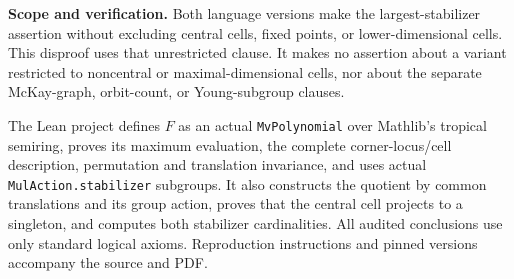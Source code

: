 \documentclass[11pt]{article}
\begin{document}
\textbf{Scope and verification.} Both language versions make the largest-stabilizer assertion without excluding central cells, fixed points, or lower-dimensional cells. This disproof uses that unrestricted clause. It makes no assertion about a variant restricted to noncentral or maximal-dimensional cells, nor about the separate McKay-graph, orbit-count, or Young-subgroup clauses.

The Lean project defines $F$ as an actual \texttt{MvPolynomial} over Mathlib's tropical semiring, proves its maximum evaluation, the complete corner-locus/cell description, permutation and translation invariance, and uses actual \texttt{MulAction.stabilizer} subgroups. It also constructs the quotient by common translations and its group action, proves that the central cell projects to a singleton, and computes both stabilizer cardinalities. All audited conclusions use only standard logical axioms. Reproduction instructions and pinned versions accompany the source and PDF.
\end{document}
